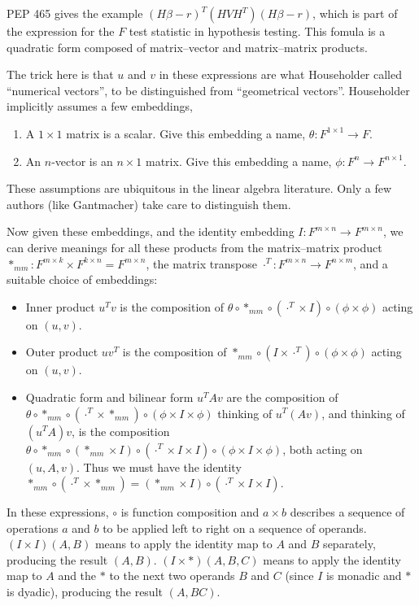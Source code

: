 PEP 465 gives the example $\left(H\beta-r\right)^{T}\left(HVH^{T}\right)\left(H\beta-r\right)$,
which is part of the expression for the $F$ test statistic in hypothesis
testing. This fomula is a quadratic form composed of matrix–vector
and matrix–matrix products.

The trick here is that $u$ and $v$ in these expressions are what
Householder called ``numerical vectors'', to be distinguished from
``geometrical vectors''. Householder implicitly assumes a few embeddings,
\begin{enumerate}
\item A $1\times1$ matrix is a scalar. Give this embedding a name, $\theta:F^{1\times1}\rightarrow F$.
\item An $n$-vector is an $n\times1$ matrix. Give this embedding a name,
$\phi:F^{n}\rightarrow F^{n\times1}$.
\end{enumerate}
These assumptions are ubiquitous in the linear algebra literature.
Only a few authors (like Gantmacher) take care to distinguish them.

Now given these embeddings, and the identity embedding $I:F^{m\times n}\rightarrow F^{m\times n}$,
we can derive meanings for all these products from the matrix–matrix
product $*_{mm}:F^{m\times k}\times F^{k\times n}=F^{m\times n}$,
the matrix transpose $\cdot^{T}:F^{m\times n}\rightarrow F^{n\times m}$,
and a suitable choice of embeddings:
\begin{itemize}
\item Inner product $u^{T}v$ is the composition of $\theta\circ*_{mm}\circ\left(\cdot^{T}\times I\right)\circ\left(\phi\times\phi\right)$
acting on $(u,v)$.
\item Outer product $uv^{T}$ is the composition of $*_{mm}\circ\left(I\times\cdot^{T}\right)\circ\left(\phi\times\phi\right)$
acting on $(u,v)$.
\item Quadratic form and bilinear form $u^{T}Av$ are the composition of
$\theta\circ*_{mm}\circ\left(\cdot^{T}\times*_{mm}\right)\circ\left(\phi\times I\times\phi\right)$
thinking of $u^{T}\left(Av\right)$, and thinking of $\left(u^{T}A\right)v$,
is the composition $\theta\circ*_{mm}\circ\left(*_{mm}\times I\right)\circ\left(\cdot^{T}\times I\times I\right)\circ\left(\phi\times I\times\phi\right)$,
both acting on $(u,A,v)$. Thus we must have the identity $*_{mm}\circ\left(\cdot^{T}\times*_{mm}\right)=\left(*_{mm}\times I\right)\circ\left(\cdot^{T}\times I\times I\right)$.
\end{itemize}
In these expressions, $\circ$ is function composition and $a\times b$
describes a sequence of operations $a$ and $b$ to be applied left
to right on a sequence of operands. $(I\times I)(A,B)$ means to apply
the identity map to $A$ and $B$ separately, producing the result
$(A,B)$. $(I\times*)(A,B,C)$ means to apply the identity map to
$A$ and the $*$ to the next two operands $B$ and $C$ (since $I$
is monadic and $*$ is dyadic), producing the result $(A,BC)$.

